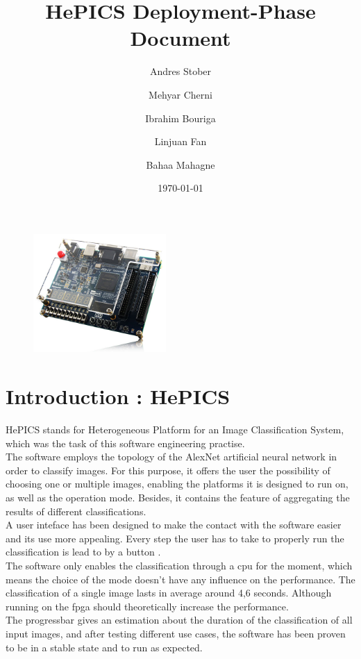\documentclass[parskip=full]{scrartcl}
\title{\Huge \textbf{HePICS Deployment-Phase Document}}
\date{\today \vspace{+10ex}}
\author{Andres Stober \\
	\and Mehyar Cherni \\
	\and Ibrahim Bouriga \\ 
	\and Linjuan Fan \\
	\and Bahaa Mahagne \\ }
\begin{document}
\maketitle
\thispagestyle{empty}


\begin{figure}[b]
\centering
\includegraphics[width=0.45\textwidth, center]{boardimage}
\end{figure}

\pagebreak

\tableofcontents
\thispagestyle{empty}
\pagebreak

\section {Introduction : HePICS}
HePICS stands for Heterogeneous Platform for an Image Classification System, which was the task of this software engineering practise.\\
The software employs the topology of the AlexNet artificial neural network in order to classify images. For this purpose, it offers the user the possibility of choosing one or multiple images, enabling the platforms it is designed to run on, as well as the operation mode. Besides, it contains the feature of aggregating the results of different classifications.\\
A user inteface has been designed to make the contact with the software easier and its use more appealing. Every step the user has to take to properly run the classification is lead to by a button .\\
The software only enables the classification through a cpu for the moment, which means the choice of the mode doesn't have any influence on the performance. The classification of a single image lasts in average around 4,6 seconds. Although running on the fpga should theoretically increase the performance.\\
The progressbar gives an estimation about the duration of the classification of all input images, and after testing different use cases, the software has been proven to be in a stable state and to run as expected.
\end{document}
